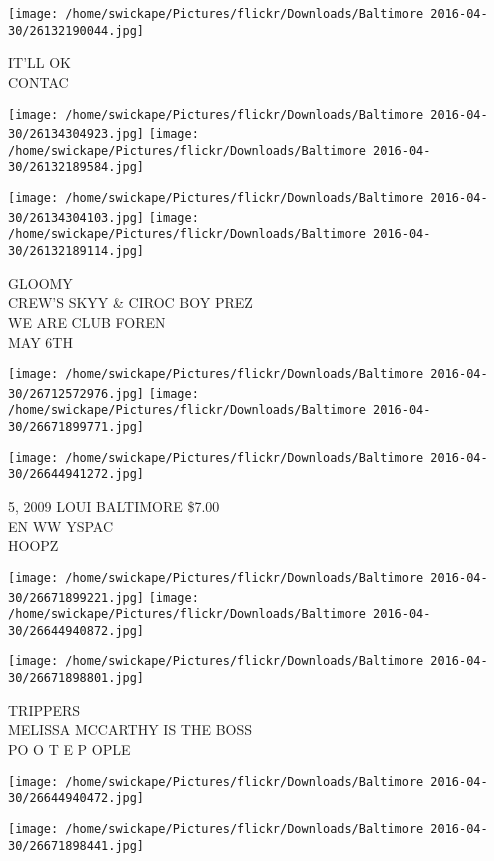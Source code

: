 \documentclass[10pt,letterpaper]{article}
\begin{document}
\vspace{0.25in}
\texttt{[image: /home/swickape/Pictures/flickr/Downloads/Baltimore 2016-04-30/26132190044.jpg]}

IT'LL OK\\
CONTAC
\pagebreak

\texttt{[image: /home/swickape/Pictures/flickr/Downloads/Baltimore 2016-04-30/26134304923.jpg]}
\texttt{[image: /home/swickape/Pictures/flickr/Downloads/Baltimore 2016-04-30/26132189584.jpg]}

\texttt{[image: /home/swickape/Pictures/flickr/Downloads/Baltimore 2016-04-30/26134304103.jpg]}
\texttt{[image: /home/swickape/Pictures/flickr/Downloads/Baltimore 2016-04-30/26132189114.jpg]}

GLOOMY\\
CREW'S SKYY \& CIROC BOY PREZ\\
WE ARE CLUB FOREN\\
MAY 6TH
\pagebreak

\texttt{[image: /home/swickape/Pictures/flickr/Downloads/Baltimore 2016-04-30/26712572976.jpg]}
\texttt{[image: /home/swickape/Pictures/flickr/Downloads/Baltimore 2016-04-30/26671899771.jpg]}

\vspace{0.25in}
\texttt{[image: /home/swickape/Pictures/flickr/Downloads/Baltimore 2016-04-30/26644941272.jpg]}

5, 2009 LOUI BALTIMORE \$7.00\\
EN WW YSPAC\\
HOOPZ
\pagebreak

\texttt{[image: /home/swickape/Pictures/flickr/Downloads/Baltimore 2016-04-30/26671899221.jpg]}
\texttt{[image: /home/swickape/Pictures/flickr/Downloads/Baltimore 2016-04-30/26644940872.jpg]}

\vspace{0.25in}
\texttt{[image: /home/swickape/Pictures/flickr/Downloads/Baltimore 2016-04-30/26671898801.jpg]}

TRIPPERS\\
MELISSA MCCARTHY IS THE BOSS\\
PO O T E P OPLE
\pagebreak

\texttt{[image: /home/swickape/Pictures/flickr/Downloads/Baltimore 2016-04-30/26644940472.jpg]}

\vspace{0.25in}
\texttt{[image: /home/swickape/Pictures/flickr/Downloads/Baltimore 2016-04-30/26671898441.jpg]}
\end{document}
